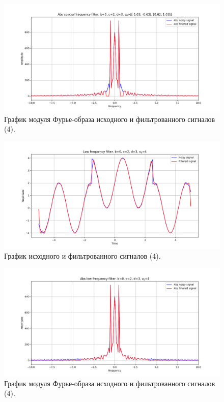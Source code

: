\documentclass[a4paper, 12pt]{article}
\begin{document}
    \begin{figure}[!htb]
        \centering
        \includegraphics[scale=0.48]{4_abs_u_U_nospec.png}
        \captionsetup{skip=0pt}
        \caption{График модуля Фурье-образа исходного и фильтрованного сигналов (4).}
        \label{fig:fig102}
    \end{figure}
    \begin{figure}[!htb]
        \centering
        \includegraphics[scale=0.48]{4_1_u_flt_u_nospec.png}
        \captionsetup{skip=0pt}
        \caption{График исходного и фильтрованного сигналов (4).}
        \label{fig:fig103}
    \end{figure}
    \begin{figure}[!htb]
        \centering
        \includegraphics[scale=0.48]{4_1_abs_u_U_nospec.png}
        \captionsetup{skip=0pt}
        \caption{График модуля Фурье-образа исходного и фильтрованного сигналов (4).}
        \label{fig:fig104}
    \end{figure}
\end{document}
